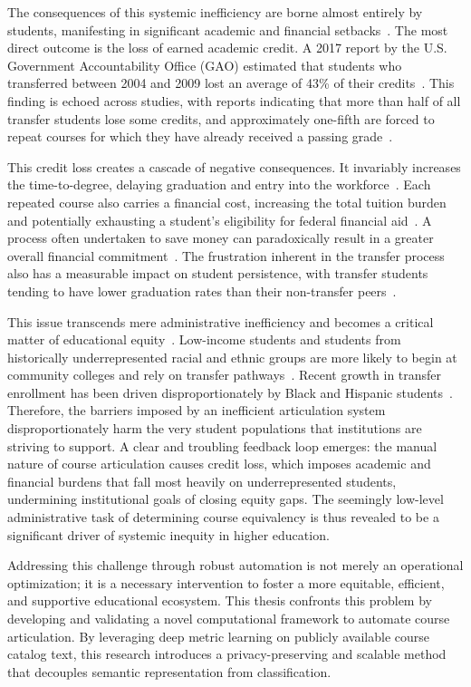 The consequences of this systemic inefficiency are borne almost entirely by students, manifesting in significant academic and financial setbacks~\cite{gao2017}. The most direct outcome is the loss of earned academic credit. A 2017 report by the U.S. Government Accountability Office (GAO) estimated that students who transferred between 2004 and 2009 lost an average of 43\% of their credits~\cite{gao2017}. This finding is echoed across studies, with reports indicating that more than half of all transfer students lose some credits, and approximately one-fifth are forced to repeat courses for which they have already received a passing grade~\cite{publicagenda2025}.

This credit loss creates a cascade of negative consequences. It invariably increases the time-to-degree, delaying graduation and entry into the workforce~\cite{gao2017}. Each repeated course also carries a financial cost, increasing the total tuition burden and potentially exhausting a student's eligibility for federal financial aid~\cite{gao2017}. A process often undertaken to save money can paradoxically result in a greater overall financial commitment~\cite{collegeopportunity2017}. The frustration inherent in the transfer process also has a measurable impact on student persistence, with transfer students tending to have lower graduation rates than their non-transfer peers~\cite{porter1999}.

This issue transcends mere administrative inefficiency and becomes a critical matter of educational equity~\cite{collegeopportunity2017}. Low-income students and students from historically underrepresented racial and ethnic groups are more likely to begin at community colleges and rely on transfer pathways~\cite{ace2025}. Recent growth in transfer enrollment has been driven disproportionately by Black and Hispanic students~\cite{nscnews2023}. Therefore, the barriers imposed by an inefficient articulation system disproportionately harm the very student populations that institutions are striving to support. A clear and troubling feedback loop emerges: the manual nature of course articulation causes credit loss, which imposes academic and financial burdens that fall most heavily on underrepresented students, undermining institutional goals of closing equity gaps. The seemingly low-level administrative task of determining course equivalency is thus revealed to be a significant driver of systemic inequity in higher education.

Addressing this challenge through robust automation is not merely an operational optimization; it is a necessary intervention to foster a more equitable, efficient, and supportive educational ecosystem. This thesis confronts this problem by developing and validating a novel computational framework to automate course articulation. By leveraging deep metric learning on publicly available course catalog text, this research introduces a privacy-preserving and scalable method that decouples semantic representation from classification.

